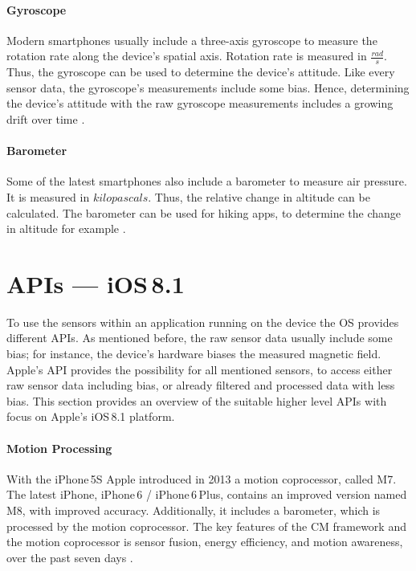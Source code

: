 \paragraph{Gyroscope}
Modern smartphones usually include a three-axis gyroscope to measure the rotation rate along the device's spatial axis. Rotation rate is measured in $\frac{rad}{s}$. Thus, the gyroscope can be used to determine the device's attitude. Like every sensor data, the gyroscope's measurements include some bias. Hence, determining the device's attitude with the raw gyroscope measurements includes a growing drift over time \citep{apple:wwdc_2012_pham,apple:ios_doc_cm}.


\paragraph{Barometer}
Some of the latest smartphones also include a barometer to measure air pressure. It is measured in $kilo pascals$. Thus, the relative change in altitude can be calculated. The barometer can be used for hiking apps, to determine the change in altitude for example \citep{apple:ios_doc_cm}.


\section{\acsp{API} --- iOS\,8.1}
To use the sensors within an application running on the device the \ac{OS} provides different \acp{API}. As mentioned before, the raw sensor data usually include some bias; for instance, the device's hardware biases the measured magnetic field. Apple's \ac{API} provides the possibility for all mentioned sensors, to access either raw sensor data including bias, or already filtered and processed data with less bias. This section provides an overview of the suitable higher level \acsp{API} with focus on Apple's iOS\,8.1 platform.


\paragraph{Motion Processing}
With the iPhone\,5S Apple introduced in 2013 a motion coprocessor, called M7. The latest iPhone, iPhone\,6 / iPhone\,6\,Plus, contains an improved version named M8, with improved accuracy. Additionally, it includes a barometer, which is processed by the motion coprocessor. The key features of the \ac{CM} framework and the motion coprocessor is sensor fusion, energy efficiency, and motion awareness, over the past seven days \citep{apple:wwdc_2014_pham}.

